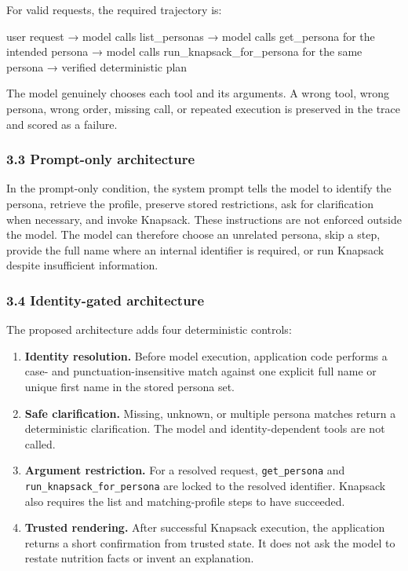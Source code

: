 \documentclass[
  10pt,
  letterpaper,
]{article}
\newenvironment{Shaded}{}{}
\newcommand{\NormalTok}[1]{#1}
\providecommand{\tightlist}{%
  \setlength{\itemsep}{0pt}\setlength{\parskip}{0pt}}
\begin{document}
For valid requests, the required trajectory is:

\begin{Shaded}
\begin{Highlighting}[]
\NormalTok{user request}
\NormalTok{    → model calls list\_personas}
\NormalTok{    → model calls get\_persona for the intended persona}
\NormalTok{    → model calls run\_knapsack\_for\_persona for the same persona}
\NormalTok{    → verified deterministic plan}
\end{Highlighting}
\end{Shaded}

The model genuinely chooses each tool and its arguments. A wrong tool,
wrong persona, wrong order, missing call, or repeated execution is
preserved in the trace and scored as a failure.

\subsubsection{3.3 Prompt-only
architecture}\label{prompt-only-architecture}

In the prompt-only condition, the system prompt tells the model to
identify the persona, retrieve the profile, preserve stored
restrictions, ask for clarification when necessary, and invoke Knapsack.
These instructions are not enforced outside the model. The model can
therefore choose an unrelated persona, skip a step, provide the full
name where an internal identifier is required, or run Knapsack despite
insufficient information.

\subsubsection{3.4 Identity-gated
architecture}\label{identity-gated-architecture}

The proposed architecture adds four deterministic controls:

\begin{enumerate}
\def\labelenumi{\arabic{enumi}.}
\tightlist
\item
  \textbf{Identity resolution.} Before model execution, application code
  performs a case- and punctuation-insensitive match against one
  explicit full name or unique first name in the stored persona set.
\item
  \textbf{Safe clarification.} Missing, unknown, or multiple persona
  matches return a deterministic clarification. The model and
  identity-dependent tools are not called.
\item
  \textbf{Argument restriction.} For a resolved request,
  \texttt{get\_persona} and \texttt{run\_knapsack\_for\_persona} are
  locked to the resolved identifier. Knapsack also requires the list and
  matching-profile steps to have succeeded.
\item
  \textbf{Trusted rendering.} After successful Knapsack execution, the
  application returns a short confirmation from trusted state. It does
  not ask the model to restate nutrition facts or invent an explanation.
\end{enumerate}
\end{document}
